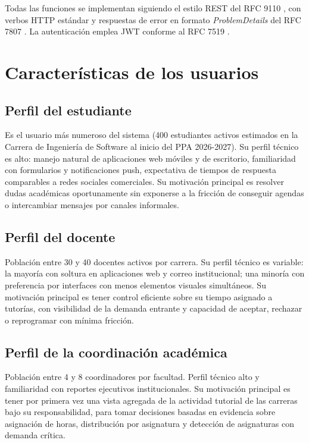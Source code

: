 \documentclass[11pt,a4paper,twoside]{report}
\begin{document}
Todas las funciones se implementan siguiendo el estilo REST del RFC 9110 \cite{rfc9110}, con verbos HTTP est\'andar y respuestas de error en formato \emph{ProblemDetails} del RFC 7807 \cite{rfc7807}. La autenticaci\'on emplea JWT conforme al RFC 7519 \cite{jones2015jwt}.

\section{Caracter\'isticas de los usuarios}
\label{sec:usuarios}

\subsection{Perfil del estudiante}

Es el usuario m\'as numeroso del sistema (400 estudiantes activos estimados en la Carrera de Ingenier\'ia de Software al inicio del PPA 2026-2027). Su perfil t\'ecnico es alto: manejo natural de aplicaciones web m\'oviles y de escritorio, familiaridad con formularios y notificaciones push, expectativa de tiempos de respuesta comparables a redes sociales comerciales. Su motivaci\'on principal es resolver dudas acad\'emicas oportunamente sin exponerse a la fricci\'on de conseguir agendas o intercambiar mensajes por canales informales.

\subsection{Perfil del docente}

Poblaci\'on entre 30 y 40 docentes activos por carrera. Su perfil t\'ecnico es variable: la mayor\'ia con soltura en aplicaciones web y correo institucional; una minor\'ia con preferencia por interfaces con menos elementos visuales simult\'aneos. Su motivaci\'on principal es tener control eficiente sobre su tiempo asignado a tutor\'ias, con visibilidad de la demanda entrante y capacidad de aceptar, rechazar o reprogramar con m\'inima fricci\'on.

\subsection{Perfil de la coordinaci\'on acad\'emica}

Poblaci\'on entre 4 y 8 coordinadores por facultad. Perfil t\'ecnico alto y familiaridad con reportes ejecutivos institucionales. Su motivaci\'on principal es tener por primera vez una vista agregada de la actividad tutorial de las carreras bajo su responsabilidad, para tomar decisiones basadas en evidencia sobre asignaci\'on de horas, distribuci\'on por asignatura y detecci\'on de asignaturas con demanda cr\'itica.
\end{document}
